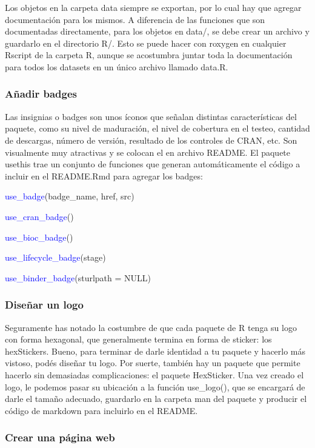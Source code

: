 Los objetos en la carpeta data siempre se exportan, por lo cual hay que agregar documentación para los mismos. A diferencia de las funciones que son documentadas directamente, para los objetos en data/, se debe crear un archivo y guardarlo en el directorio R/. Esto se puede hacer con roxygen en cualquier Rscript de la carpeta R, aunque se acostumbra juntar toda la documentación para todos los datasets en un único archivo llamado data.R.\\

\subsubsection{Añadir badges}

Las insignias o badges son unos íconos que señalan distintas características del paquete, como su nivel de maduración, el nivel de cobertura en el testeo, cantidad de descargas, número de versión, resultado de los controles de CRAN, etc.
Son visualmente muy atractivas y se colocan el en archivo README.     El paquete usethis trae un conjunto de funciones que generan automáticamente el código a incluir en el README.Rmd para agregar los badges:


\textcolor{blue}{use\_badge}(badge\_name, href, src)

\textcolor{blue}{use\_cran\_badge}()

\textcolor{blue}{use\_bioc\_badge}()

\textcolor{blue}{use\_lifecycle\_badge}(stage)

\textcolor{blue}{use\_binder\_badge}(sturlpath = NULL)


\subsubsection{Diseñar un logo}

Seguramente has notado la costumbre de que cada paquete de R tenga su logo con forma hexagonal, que generalmente termina en forma de sticker: los hexStickers.
Bueno, para terminar de darle identidad a tu paquete y hacerlo más vistoso, podés diseñar tu logo.
Por suerte, también hay un paquete que permite hacerlo sin demasiadas complicaciones: el paquete HexSticker.
Una vez creado el logo, le podemos pasar su ubicación a la función use\_logo(), que se encargará de darle el tamaño adecuado, guardarlo en la carpeta man del paquete y producir el código de markdown para incluirlo en el README.



\subsubsection{Crear una página web}


